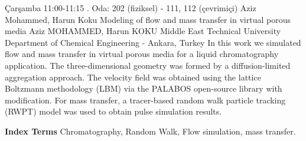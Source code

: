 
    \begin{abstract_basarim}
    {Çarşamba 11:00-11:15}
    {.}
    {Oda: 202 (fiziksel) - 111, 112 (çevrimiçi)}
    {Aziz Mohammed, Harun Koku}
    {Modeling of flow and mass transfer in virtual porous media}
    {%
    Aziz MOHAMMED, Harun KOKU}
    {%
    }
    {%
    Middle East Technical University Department of Chemical Engineering - Ankara, Turkey}
    In this work we simulated flow and mass transfer in virtual porous media for a liquid chromatography application. The three-dimensional geometry was formed by a diffusion-limited aggregation approach. The velocity field was obtained using the lattice Boltzmann methodology (LBM) via the PALABOS open-source library with modification. For mass transfer, a tracer-based random walk particle tracking (RWPT) model was used to obtain pulse simulation results. 
    
            \textbf{Index Terms} \newline{}Chromatography, Random Walk, Flow simulation, mass transfer.
    \end{abstract_basarim}
    